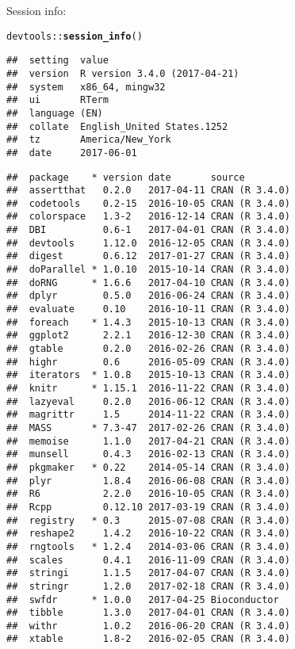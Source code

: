 \documentclass{article}\usepackage[]{graphicx}\usepackage[]{color}
\makeatletter
\newcommand{\hlopt}[1]{\textcolor[rgb]{0,0,0}{#1}}%
\newcommand{\hlstd}[1]{\textcolor[rgb]{0.345,0.345,0.345}{#1}}%
\newcommand{\hlkwd}[1]{\textcolor[rgb]{0.737,0.353,0.396}{\textbf{#1}}}%
\newenvironment{kframe}{%
 \def\at@end@of@kframe{}%
 \ifinner\ifhmode%
  \def\at@end@of@kframe{\end{minipage}}%
  \begin{minipage}{\columnwidth}%
 \fi\fi%
 \def\FrameCommand##1{\hskip\@totalleftmargin \hskip-\fboxsep
 \colorbox{shadecolor}{##1}\hskip-\fboxsep
     \hskip-\linewidth \hskip-\@totalleftmargin \hskip\columnwidth}%
 \MakeFramed {\advance\hsize-\width
   \@totalleftmargin\z@ \linewidth\hsize
   \@setminipage}}%
 {\par\unskip\endMakeFramed%
 \at@end@of@kframe}
\newenvironment{knitrout}{}{} %
\makeatother
\begin{document}
Session info:
\begin{knitrout}
\color{fgcolor}\begin{kframe}
\begin{alltt}
\hlstd{devtools}\hlopt{::}\hlkwd{session_info}\hlstd{()}
\end{alltt}


{\ttfamily\noindent\itshape\color{messagecolor}{\#\# Session info -----------------------------------------------}}\begin{verbatim}
##  setting  value                       
##  version  R version 3.4.0 (2017-04-21)
##  system   x86_64, mingw32             
##  ui       RTerm                       
##  language (EN)                        
##  collate  English_United States.1252  
##  tz       America/New_York            
##  date     2017-06-01
\end{verbatim}


{\ttfamily\noindent\itshape\color{messagecolor}{\#\# Packages ---------------------------------------------------}}\begin{verbatim}
##  package    * version date       source        
##  assertthat   0.2.0   2017-04-11 CRAN (R 3.4.0)
##  codetools    0.2-15  2016-10-05 CRAN (R 3.4.0)
##  colorspace   1.3-2   2016-12-14 CRAN (R 3.4.0)
##  DBI          0.6-1   2017-04-01 CRAN (R 3.4.0)
##  devtools     1.12.0  2016-12-05 CRAN (R 3.4.0)
##  digest       0.6.12  2017-01-27 CRAN (R 3.4.0)
##  doParallel * 1.0.10  2015-10-14 CRAN (R 3.4.0)
##  doRNG      * 1.6.6   2017-04-10 CRAN (R 3.4.0)
##  dplyr        0.5.0   2016-06-24 CRAN (R 3.4.0)
##  evaluate     0.10    2016-10-11 CRAN (R 3.4.0)
##  foreach    * 1.4.3   2015-10-13 CRAN (R 3.4.0)
##  ggplot2      2.2.1   2016-12-30 CRAN (R 3.4.0)
##  gtable       0.2.0   2016-02-26 CRAN (R 3.4.0)
##  highr        0.6     2016-05-09 CRAN (R 3.4.0)
##  iterators  * 1.0.8   2015-10-13 CRAN (R 3.4.0)
##  knitr      * 1.15.1  2016-11-22 CRAN (R 3.4.0)
##  lazyeval     0.2.0   2016-06-12 CRAN (R 3.4.0)
##  magrittr     1.5     2014-11-22 CRAN (R 3.4.0)
##  MASS       * 7.3-47  2017-02-26 CRAN (R 3.4.0)
##  memoise      1.1.0   2017-04-21 CRAN (R 3.4.0)
##  munsell      0.4.3   2016-02-13 CRAN (R 3.4.0)
##  pkgmaker   * 0.22    2014-05-14 CRAN (R 3.4.0)
##  plyr         1.8.4   2016-06-08 CRAN (R 3.4.0)
##  R6           2.2.0   2016-10-05 CRAN (R 3.4.0)
##  Rcpp         0.12.10 2017-03-19 CRAN (R 3.4.0)
##  registry   * 0.3     2015-07-08 CRAN (R 3.4.0)
##  reshape2     1.4.2   2016-10-22 CRAN (R 3.4.0)
##  rngtools   * 1.2.4   2014-03-06 CRAN (R 3.4.0)
##  scales       0.4.1   2016-11-09 CRAN (R 3.4.0)
##  stringi      1.1.5   2017-04-07 CRAN (R 3.4.0)
##  stringr      1.2.0   2017-02-18 CRAN (R 3.4.0)
##  swfdr      * 1.0.0   2017-04-25 Bioconductor  
##  tibble       1.3.0   2017-04-01 CRAN (R 3.4.0)
##  withr        1.0.2   2016-06-20 CRAN (R 3.4.0)
##  xtable       1.8-2   2016-02-05 CRAN (R 3.4.0)
\end{verbatim}
\end{kframe}
\end{knitrout}
\end{document}
